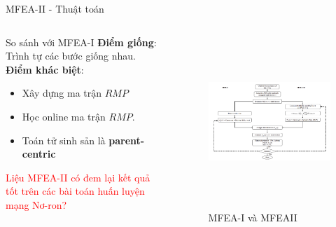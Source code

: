     \begin{frame}{MFEA-II - Thuật toán}
        \begin{columns}

                \begin{itemize}
    		    \begin{block}{So sánh với MFEA-I}
    		     \textbf{Điểm giống}: Trình tự các bước giống nhau.\\
    		    \textbf{Điểm khác biệt}:
                \begin{itemize}
                    \item Xây dựng ma trận $RMP$
                    \item Học online ma trận $RMP$.
                    \item Toán tử sinh sản là \textbf{parent-centric}
                \end{itemize}
    			\end{block}
    			\begin{block}{}
                   \textcolor{red}{Liệu MFEA-II có đem lại kết quả tốt trên các bài toán huấn luyện mạng Nơ-ron?}
    			\end{block}
		    \end{itemize}
		    
        		\begin{figure}[ht]
                    \centering
                    \includegraphics[width=1.0\linewidth, height=6.5cm]{images/mfeaii.png}
                    \caption{\small{MFEA-I và MFEAII}}
                    \label{fig:mfeaii}
                \end{figure}
        \end{columns}
	\end{frame}